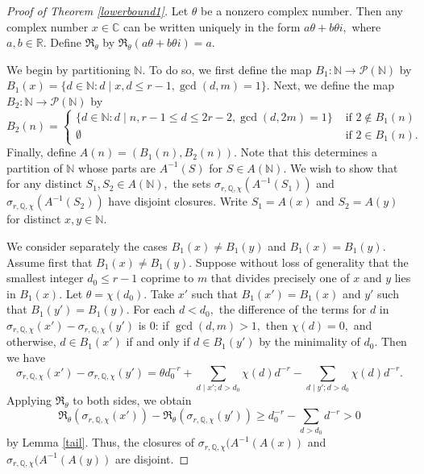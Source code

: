 \documentclass[12pt]{amsart}
\theoremstyle{definition}
\numberwithin{equation}{section}
\newcommand{\C}{\mathbb{C}}
\newcommand{\Q}{\mathbb{Q}}
\newcommand{\N}{\mathbb{N}}
\newcommand{\R}{\mathbb{R}}
\begin{document}
\begin{proof}[Proof of Theorem \ref{lowerbound1}]
Let $\theta$ be a nonzero complex number. Then any complex number $x \in \C$ can be written uniquely in the form $a \theta + b \theta i,$ where $a,b \in \R.$ Define $\Re_\theta$ by $\Re_\theta(a\theta + b \theta i) = a.$


We begin by partitioning $\N$. To do so, we first define the map $B_1: \N \rightarrow \mathcal{P}(\N)$ by $B_1(x) = \{d \in \N : d \mid x, d \leq r-1, \gcd(d,m)=1\}.$ Next, we define the map $B_2 : \N \rightarrow \mathcal {P} (\N)$ by $$B_2(n) = \begin{cases}
    \{d \in \N : d \mid n, r-1 \leq d \leq 2r-2, \gcd(d, 2m) = 1\} & \text{ if } 2 \not\in B_1(n) \\
    \emptyset &\text{ if }2 \in B_1(n).
\end{cases}$$
Finally, define $A(n) = (B_1(n), B_2(n)).$
Note that this determines a partition of $\N$ whose parts are $A^{-1}(S)$ for $S \in A(\N).$ We wish to show that for any distinct $S_1, S_2 \in A(\N),$ the sets $\sigma_{r,\Q,\chi}(A^{-1}(S_1))$ and $\sigma_{r,\Q,\chi}(A^{-1}(S_2))$ have disjoint closures. Write $S_1 = A(x)$ and $S_2 = A(y)$ for distinct $x,y \in \N.$ 

    We consider separately the cases $B_1(x) \neq B_1(y)$ and $B_1(x) = B_1(y)$. Assume first that $B_1(x) \neq B_1(y)$.  Suppose without loss of generality that the smallest integer $d_0 \leq r-1$ coprime to $m$ that divides precisely one of $x$ and $y$ lies in $B_1(x)$. Let $\theta = \chi(d_0).$ Take $x'$ such that $B_1(x') = B_1(x)$ and $y'$ such that $B_1(y') = B_1(y).$ For each $d < d_0,$ the difference of the terms for $d$ in $\sigma_{r,\Q,\chi} (x') - \sigma_{r, \Q,\chi}(y')$ is 0: if $\gcd(d,m) > 1,$ then $\chi(d) = 0,$ and otherwise, $d \in B_1(x')$ if and only if $d \in B_1(y')$ by the minimality of $d_0.$ Then we have $$\sigma_{r,\Q,\chi} (x') - \sigma_{r, \Q,\chi}(y') = \theta d_0^{-r} + \sum_{d \mid x'; d > d_0} \chi(d)  d^{-r} - \sum_{d \mid y'; d > d_0} \chi(d) d^{-r}.$$ Applying $\Re_\theta$ to both sides, we obtain $$\Re_\theta(\sigma_{r,\Q,\chi}(x')) - \Re_\theta(\sigma_{r,\Q,\chi}(y')) \geq d_0^{-r} - \sum_{d > d_0} d^{-r} > 0$$ by Lemma \ref{tail}. 
Thus, the closures of $\sigma_{r,\Q,\chi}(A^{-1}(A(x))$ and $\sigma_{r,\Q,\chi}(A^{-1}(A(y))$ are disjoint. 


\end{proof}
\end{document}
